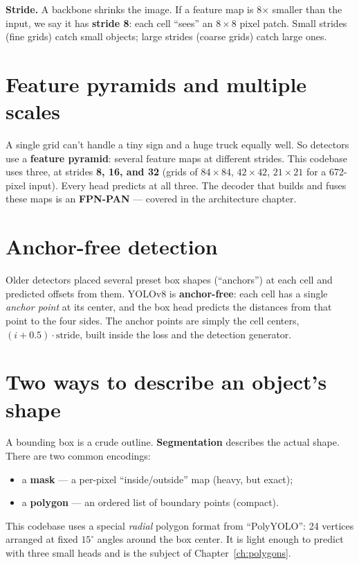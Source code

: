\begin{teacher}
\textbf{Stride.} A backbone shrinks the image. If a feature map is 8$\times$ smaller than
the input, we say it has \textbf{stride 8}: each cell ``sees'' an $8\times8$ pixel patch.
Small strides (fine grids) catch small objects; large strides (coarse grids) catch large
ones.
\end{teacher}

\section{Feature pyramids and multiple scales}
A single grid can't handle a tiny sign and a huge truck equally well. So detectors use a
\textbf{feature pyramid}: several feature maps at different strides. This codebase uses
three, at strides \textbf{8, 16, and 32} (grids of $84\times84$, $42\times42$,
$21\times21$ for a 672-pixel input). Every head predicts at all three. The decoder that
builds and fuses these maps is an \textbf{FPN-PAN} --- covered in the architecture chapter.

\section{Anchor-free detection}
Older detectors placed several preset box shapes (``anchors'') at each cell and predicted
offsets from them. YOLOv8 is \textbf{anchor-free}: each cell has a single \emph{anchor
point} at its center, and the box head predicts the distances from that point to the four
sides. The anchor points are simply the cell centers, $(i+0.5)\cdot\text{stride}$,
built inside the loss and the detection generator.

\section{Two ways to describe an object's shape}
A bounding box is a crude outline. \textbf{Segmentation} describes the actual shape. There
are two common encodings:

\begin{itemize}[leftmargin=1.4em,itemsep=2pt]
  \item a \textbf{mask} --- a per-pixel ``inside/outside'' map (heavy, but exact);
  \item a \textbf{polygon} --- an ordered list of boundary points (compact).
\end{itemize}

\noindent This codebase uses a special \emph{radial} polygon format from
``PolyYOLO'': 24 vertices arranged at fixed $15^\circ$ angles around the box center. It
is light enough to predict with three small heads and is the subject of
Chapter~\ref{ch:polygons}.

